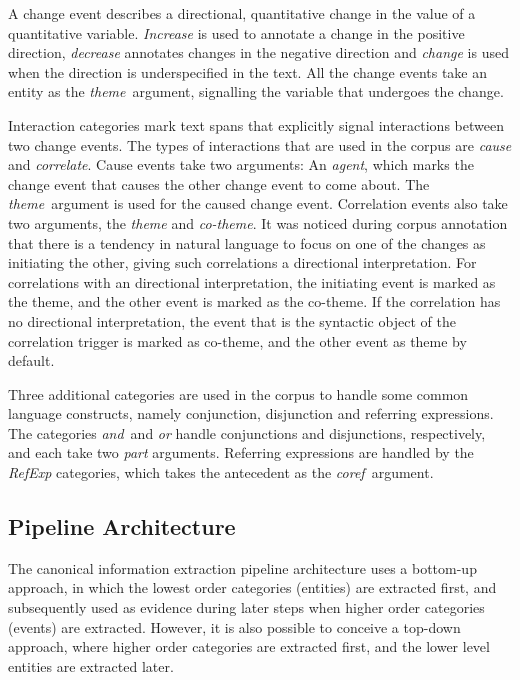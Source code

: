 A change event describes a directional, quantitative change in the value of a quantitative variable. \emph{Increase} is used to annotate a change in the positive direction, \emph{decrease} annotates changes in the negative direction and \emph{change} is used when the direction is underspecified in the text. All the change events take an entity as the \emph{theme} argument, signalling the variable that undergoes the change.

Interaction categories mark text spans that explicitly signal interactions between two change events. The types of interactions that are used in the corpus are \emph{cause} and \emph{correlate}. Cause events take two arguments: An \emph{agent}, which marks the change event that causes the other change event to come about. The \emph{theme} argument is used for the caused change event. Correlation events also take two arguments, the \emph{theme} and \emph{co-theme}. It was noticed during corpus annotation that there is a tendency in natural language to focus on one of the changes as initiating the other, giving such correlations a directional interpretation. For correlations with an directional interpretation, the initiating event is marked as the theme, and the other event is marked as the co-theme. If the correlation has no directional interpretation, the event that is the syntactic object of the correlation trigger is marked as co-theme, and the other event as theme by default.

Three additional categories are used in the corpus to handle some common language constructs, namely conjunction, disjunction and referring expressions. The categories \emph{and} and \emph{or} handle conjunctions and disjunctions, respectively, and each take two \emph{part} arguments. Referring expressions are handled by the \emph{RefExp} categories, which takes the antecedent as the \emph{coref} argument.

\subsection{Pipeline Architecture}

The canonical information extraction pipeline architecture uses a bottom-up approach, in which the lowest order categories (entities) are extracted first, and subsequently used as evidence during later steps when higher order categories (events) are extracted. However, it is also possible to conceive a top-down approach, where higher order categories are extracted first, and the lower level entities are extracted later. 

